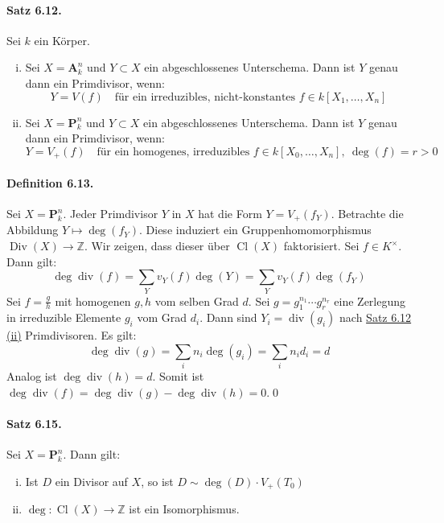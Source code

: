 \paragraph{Satz 6.12.}\label{6.12} Sei $k$ ein Körper.
\begin{enumerate}[(i)]
\item Sei $X=\mathbf{A}_k^n$ und $Y\subset X$ ein abgeschlossenes Unterschema. Dann ist $Y$ genau dann ein Primdivisor, wenn:
\[Y=V(f)\quad\text{für ein irreduzibles, nicht-konstantes }f\in k[X_1,\ldots,X_n]  \]
\item Sei $X=\mathbf{P}_k^n$ und $Y\subset X$ ein abgeschlossenes Unterschema. Dann ist $Y$ genau dann ein Primdivisor, wenn:
\[Y=V_+(f)\quad\text{für ein homogenes, irreduzibles }f\in k[X_0,\ldots,X_n],\ \deg(f)=r>0 \]
\end{enumerate}

\paragraph{Definition 6.13.}\label{6.13} Sei $X=\mathbf{P}^n_k$. Jeder Primdivisor $Y$ in $X$ hat die Form $Y=V_+(f_Y)$. Betrachte die Abbildung $Y\mapsto\deg(f_Y)$. Diese induziert ein Gruppenhomomorphismus $\operatorname{Div}(X)\to\mathbb{Z}$. Wir zeigen, dass dieser über $\operatorname{Cl}(X)$ faktorisiert. Sei $f\in K^\times$. Dann gilt:
\[\deg\operatorname{div}(f)=\sum_Y v_Y(f) \deg(Y)=\sum_Y v_Y(f) \deg(f_Y) \]
Sei $f=\frac{g}{h}$ mit homogenen $g,h$ vom selben Grad $d$. Sei $g=g_1^{n_1}\cdots g_r^{n_r}$ eine Zerlegung in irreduzible Elemente $g_i$ vom Grad $d_i$. Dann sind $Y_i=\operatorname{div}(g_i)$ nach \hyperref[6.12]{Satz 6.12 (ii)} Primdivisoren. Es gilt:
\[\deg\operatorname{div}(g)=\sum_i n_i\deg(g_i) = \sum_i n_id_i = d \]
Analog ist $\deg\operatorname{div}(h)=d$. Somit ist $\deg\operatorname{div}(f)=\deg\operatorname{div}(g)-\deg\operatorname{div}(h)=0$.\qed

\paragraph{Satz 6.15.}\label{6.15} Sei $X=\mathbf{P}_k^n$. Dann gilt:
\begin{enumerate}[(i)]
\item Ist $D$ ein Divisor auf $X$, so ist $D\sim\deg(D)\cdot V_+(T_0)$
\item $\deg:\operatorname{Cl}(X)\to\mathbb{Z}$ ist ein Isomorphismus.
\end{enumerate}

